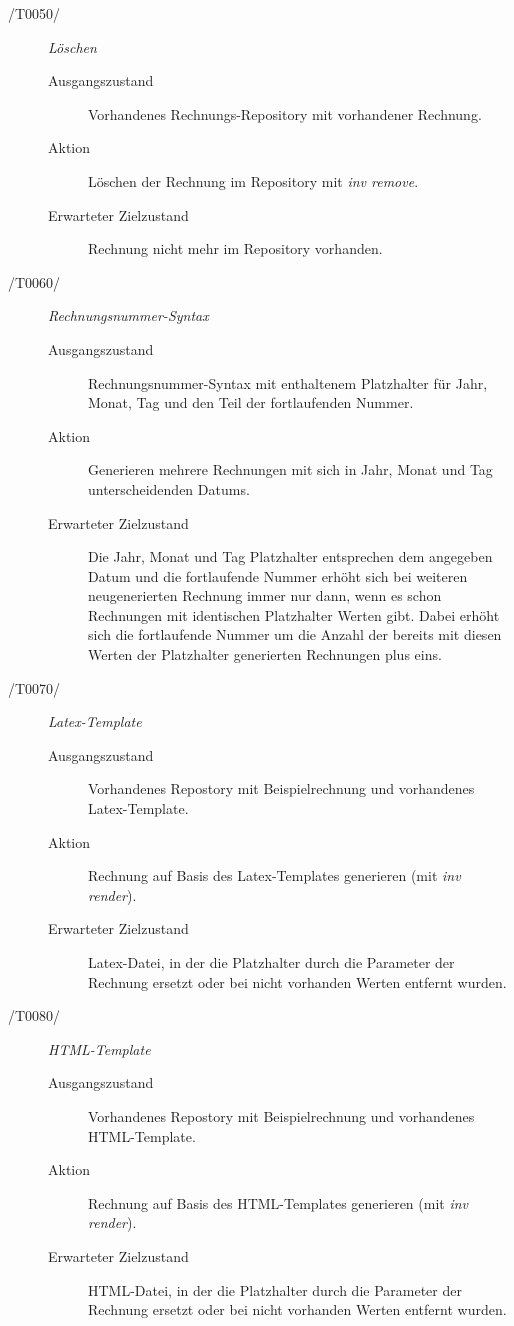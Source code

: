 \begin{description}
  \item[/T0050/]
	\textit{Löschen}
	\begin{description}
		\item[Ausgangszustand]
		Vorhandenes Rechnungs-Repository mit vorhandener Rechnung.
		\item[Aktion]
		Löschen der Rechnung im Repository mit \textit{inv remove}.
		\item[Erwarteter Zielzustand]
		Rechnung nicht mehr im Repository vorhanden.
	\end{description}

  \item[/T0060/]
	\textit{Rechnungsnummer-Syntax}
	\begin{description}
		\item[Ausgangszustand]
		Rechnungsnummer-Syntax mit enthaltenem Platzhalter für Jahr, Monat, Tag und den Teil der fortlaufenden Nummer.
		\item[Aktion]
		Generieren mehrere Rechnungen mit sich in Jahr, Monat und Tag unterscheidenden Datums.
		\item[Erwarteter Zielzustand]
		Die Jahr, Monat und Tag Platzhalter entsprechen dem angegeben Datum und die fortlaufende Nummer erhöht sich bei weiteren neugenerierten Rechnung immer nur dann, wenn es schon Rechnungen mit identischen Platzhalter Werten gibt. Dabei erhöht sich die fortlaufende Nummer um die Anzahl der bereits mit diesen Werten der Platzhalter generierten Rechnungen plus eins.
	\end{description}

  \item[/T0070/]
	\textit{Latex-Template}
	\begin{description}
		\item[Ausgangszustand]
		Vorhandenes Repostory mit Beispielrechnung und vorhandenes Latex-Template.
		\item[Aktion]
		Rechnung auf Basis des Latex-Templates generieren (mit \textit{inv render}).
		\item[Erwarteter Zielzustand]
		Latex-Datei, in der die Platzhalter durch die Parameter der Rechnung ersetzt oder bei nicht vorhanden Werten entfernt wurden.
	\end{description}

  \item[/T0080/]
	\textit{HTML-Template}
	\begin{description}
		\item[Ausgangszustand]
		Vorhandenes Repostory mit Beispielrechnung und vorhandenes HTML-Template.
		\item[Aktion]
		Rechnung auf Basis des HTML-Templates generieren (mit \textit{inv render}).
		\item[Erwarteter Zielzustand]
		HTML-Datei, in der die Platzhalter durch die Parameter der Rechnung ersetzt oder bei nicht vorhanden Werten entfernt wurden.
	\end{description}
\end{description}
